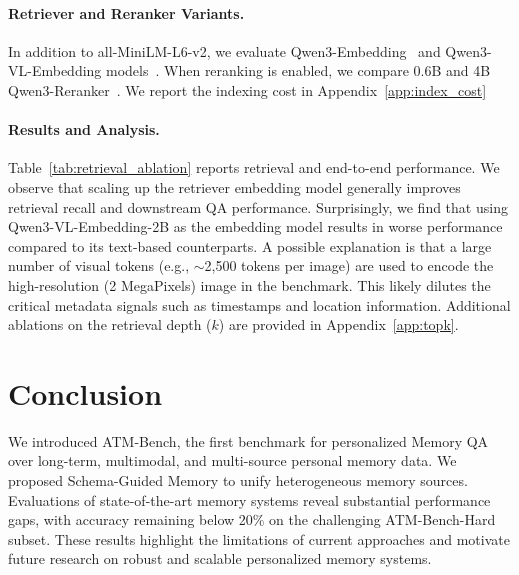 \documentclass{article}
\theoremstyle{plain}
\theoremstyle{definition}
\theoremstyle{remark}
\begin{document}

\paragraph{Retriever and Reranker Variants.}
In addition to all-MiniLM-L6-v2, we evaluate Qwen3-Embedding~\citep{qwen3embed} and Qwen3-VL-Embedding models~\citep{Li2026qwen3vl}. When reranking is enabled, we compare 0.6B and 4B Qwen3-Reranker~\citep{qwen3embed}.  We report the indexing cost in Appendix~\ref{app:index_cost}


\paragraph{Results and Analysis.}
Table~\ref{tab:retrieval_ablation} reports retrieval and end-to-end performance. We observe that scaling up the retriever embedding model generally improves retrieval recall and downstream QA performance. %
Surprisingly, we find that using Qwen3-VL-Embedding-2B as the embedding model results in worse performance compared to its text-based counterparts. A possible explanation is that a large number of visual tokens (e.g., $\sim$2,500 tokens per image) are used to encode the high-resolution (2 MegaPixels) image in the benchmark. This likely dilutes the critical metadata signals such as timestamps and location information. Additional ablations on the retrieval depth ($k$) are provided in Appendix~\ref{app:topk}.


\section{Conclusion}
We introduced ATM-Bench, the first benchmark for personalized Memory QA over long-term, multimodal, and multi-source personal memory data. We proposed Schema-Guided Memory to unify heterogeneous memory sources. Evaluations of state-of-the-art memory systems reveal substantial performance gaps, with accuracy remaining below 20\% on the challenging ATM-Bench-Hard subset. These results highlight the limitations of current approaches and motivate future research on robust and scalable personalized memory systems.
\end{document}
